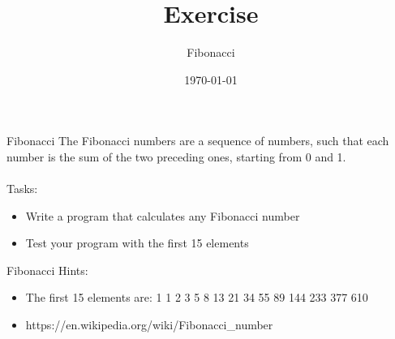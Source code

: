 


\title{Exercise}
\subtitle{Fibonacci}
\date{\today}




\begin{frame}
    \titlepage
\end{frame}

\begin{frame}{Fibonacci}
    The Fibonacci numbers are a sequence of numbers, such that each number is the sum of the two preceding ones, starting from 0 and 1.\\
    \\
    Tasks:
    \begin{itemize}
        \item Write a program that calculates any Fibonacci number
        \item Test your program with the first 15 elements
    \end{itemize}
\end{frame}

\begin{frame}{Fibonacci}
    Hints:
    \begin{itemize}
        \item The first 15 elements are: 1 1 2 3 5 8 13 21 34 55 89 144 233 377 610
        \item https://en.wikipedia.org/wiki/Fibonacci_number
    \end{itemize}
\end{frame}



